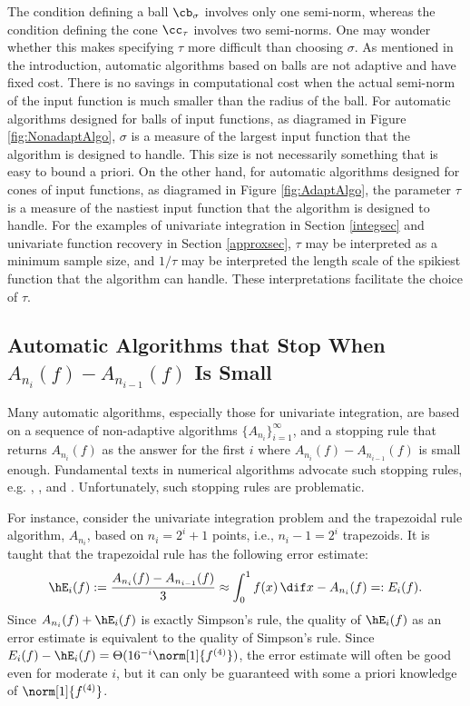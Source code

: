\documentclass[]{elsarticle}
\theoremstyle{definition}
\theoremstyle{remark}
\begin{document}
The condition defining a ball $\cb_{\sigma}$ involves only one semi-norm, whereas the condition defining the cone $\cc_{\tau}$ involves two semi-norms.  One may wonder whether this makes specifying $\tau$ more difficult than choosing $\sigma$.  As mentioned in the introduction, automatic algorithms based on balls are not adaptive and have fixed cost. There is no savings in computational cost when the actual semi-norm of the input function is much smaller than the radius of the ball. For automatic algorithms designed for balls of input functions, as diagramed in Figure \ref{fig:NonadaptAlgo},  $\sigma$ is a measure of the largest input function that the algorithm is designed to handle.  This size is not necessarily something that is easy to bound a priori.  On the other hand, for automatic algorithms designed for cones of input functions, as diagramed in Figure \ref{fig:AdaptAlgo}, the parameter $\tau$ is a measure of the nastiest input function that the algorithm is designed to handle.  For the examples of univariate integration in Section \ref{integsec} and univariate function recovery in Section \ref{approxsec}, $\tau$ may be interpreted as a minimum sample size, and $1/\tau$ may be interpreted the length scale of the spikiest function that the algorithm can handle. These interpretations facilitate the choice of $\tau$. 

\subsection{Automatic Algorithms that Stop When $A_{n_{i}}(f)-A_{n_{i-1}}(f)$ Is Small}

Many automatic algorithms, especially those for univariate integration, are based on a sequence of non-adaptive algorithms $\{A_{n_i}\}_{i=1}^{\infty}$, and a stopping rule that returns $A_{n_{i}}(f)$ as the answer for the first $i$ where $A_{n_{i}}(f)-A_{n_{i-1}}(f)$ is small enough.  Fundamental texts in numerical algorithms advocate such stopping rules, e.g. \cite[p.\ 223--224]{BurFai10}, \cite[p.\ 233]{CheKin12a}, and \cite[p.\ 270]{Sau12a}.  Unfortunately, such stopping rules are problematic.

For instance, consider the univariate integration problem and the trapezoidal rule algorithm, $A_{n_i}$, based on $n_i=2^i+1$ points, i.e., $n_i-1=2^i$ trapezoids.  It is taught that the trapezoidal rule has the following error estimate:
\[
\hE_i(f):=\frac{A_{n_{i}}(f)-A_{n_{i-1}}(f)}{3} \approx \int_0^1 f(x) \, \dif x - A_{n_i}(f) =:E_i(f).
\]
Since $A_{n_i}(f)+ \hE_i(f)$ is exactly Simpson's rule, the quality of $\hE_i(f)$ as an error estimate is equivalent to the quality of Simpson's rule. Since $E_i(f) -\hE_i(f) = \Theta(16^{-i} \norm[1]{f^{(4)}})$, the error estimate will often be good even for moderate $i$, but it can only be guaranteed with some a priori knowledge of $\norm[1]{f^{(4)}}$.
\end{document}
